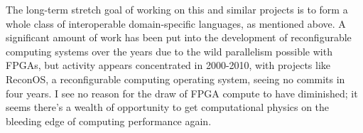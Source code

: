 \documentclass[12pt, arial, letterpaper]{article}
\begin{document}
The long-term stretch goal of working on this and similar projects is to form a whole class of interoperable domain-specific languages, as mentioned above. A significant amount of work has been put into the development of reconfigurable computing systems over the years\cite{moth} due to the wild parallelism possible with FPGAs, but activity appears concentrated in 2000-2010, with projects like ReconOS\cite{recon}, a reconfigurable computing operating system, seeing no commits in four years. I see no reason for the draw of FPGA compute to have diminished; it seems there's a wealth of opportunity to get computational physics on the bleeding edge of computing performance again.



\end{document}
